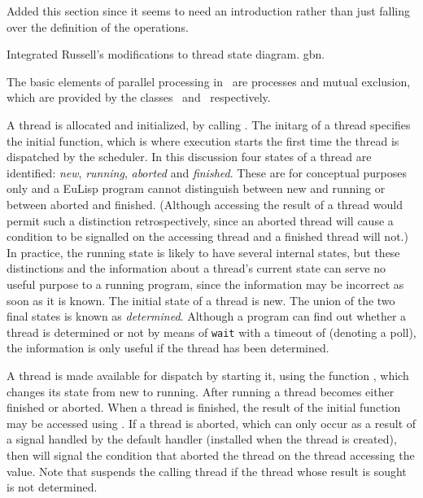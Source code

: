 %
\begin{optPrivate}
Added this section since it seems to need an introduction rather than
just falling over the definition of the operations.

Integrated Russell's modifications to thread state diagram. gbn.
\end{optPrivate}
%
\begin{optDefinition}
The basic elements of parallel processing in \eulisp\ are processes and
mutual exclusion, which are provided by the classes \ and
\ respectively.

A thread is allocated and initialized, by calling .  The
initarg of a thread specifies the initial function, which is where execution
starts the first time the thread is dispatched by the scheduler.  In this
discussion four states of a thread are identified: {\it new}, {\it running},
{\it aborted} and {\it finished}.  These are for conceptual purposes only and a
EuLisp program cannot distinguish between new and running or between aborted and
finished.  (Although accessing the result of a thread would permit such a
distinction retrospectively, since an aborted thread will cause a condition to
be signalled on the accessing thread and a finished thread will not.)  In
practice, the running state is likely to have several internal states, but these
distinctions and the information about a thread's current state can serve no
useful purpose to a running program, since the information may be incorrect as
soon as it is known.  The initial state of a thread is new.  The union of the
two final states is known as {\em determined}.  Although a program can find out
whether a thread is determined or not by means of {\tt wait} with a timeout of
\true\/ (denoting a poll), the information is only useful if the thread has been
determined.

A thread is made available for dispatch by starting it, using the function
, which changes its state from new to running.  After
running a thread becomes either finished or aborted.  When a thread is finished,
the result of the initial function may be accessed using
.  If a thread is aborted, which can only occur as a
result of a signal handled by the default handler (installed when the thread is
created), then  will signal the condition that aborted
the thread on the thread accessing the value.  Note that
 suspends the calling thread if the thread whose
result is sought is not determined.


\end{optDefinition}
